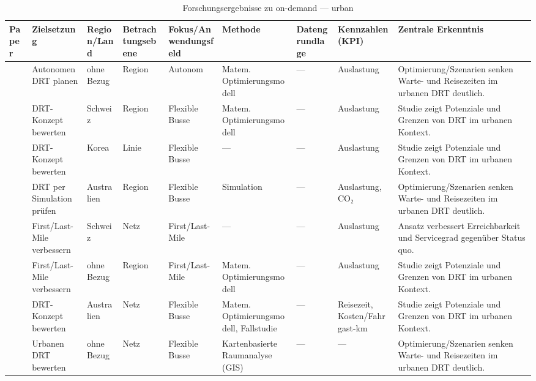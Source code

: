 \begin{table}[p]
\centering
\caption{Forschungsergebnisse zu on-demand — urban}
\label{tab:ondemand-urban-2}
\scriptsize
\setlength{\tabcolsep}{2.5pt}
\begin{tabularx}{\textwidth}{
  >{\RaggedRight\arraybackslash}p{2.8cm}
  >{\RaggedRight\arraybackslash}p{2.2cm}
  >{\RaggedRight\arraybackslash}p{1.8cm}
  >{\RaggedRight\arraybackslash}p{1.8cm}
  >{\RaggedRight\arraybackslash}p{2.0cm}
  >{\RaggedRight\arraybackslash}p{2.6cm}
  >{\RaggedRight\arraybackslash}p{1.8cm}
  >{\RaggedRight\arraybackslash}p{2.2cm}
  >{\RaggedRight\arraybackslash}X
}
\toprule
Paper & Zielsetzung & Region/Land & Betrachtungsebene & Fokus/Anwendungsfeld & Methode & Datengrundlage & Kennzahlen (KPI) & Zentrale Erkenntnis \\
\midrule
\textcite{ja\_ger\_2018\_multiagentsimulati} & Autonomen DRT planen & ohne Bezug & Region & Autonom & Matem. Optimierungsmodell & — & Auslastung & Optimierung/Szenarien senken Warte- und Reisezeiten im urbanen DRT deutlich. \\ \hline
\textcite{kim\_2025\_optimizationandimp} & DRT-Konzept bewerten & Schweiz & Region & Flexible Busse & Matem. Optimierungsmodell & — & Auslastung & Studie zeigt Potenziale und Grenzen von DRT im urbanen Kontext. \\ \hline
\textcite{li\_2024\_efficientrouteplan} & DRT-Konzept bewerten & Korea & Linie & Flexible Busse & — & — & Auslastung & Studie zeigt Potenziale und Grenzen von DRT im urbanen Kontext. \\ \hline
\textcite{liyanage\_2020\_anagentbasedsimula} & DRT per Simulation prüfen & Australien & Region & Flexible Busse & Simulation & — & Auslastung, CO₂ & Optimierung/Szenarien senken Warte- und Reisezeiten im urbanen DRT deutlich. \\ \hline
\textcite{melo\_2024\_demandresponsivetr} & First/Last-Mile verbessern & Schweiz & Netz & First/Last-Mile & — & — & Auslastung & Ansatz verbessert Erreichbarkeit und Servicegrad gegenüber Status quo. \\ \hline
\textcite{meshkani\_2024\_innovativeondemand} & First/Last-Mile verbessern & ohne Bezug & Region & First/Last-Mile & Matem. Optimierungsmodell & — & Auslastung & Studie zeigt Potenziale und Grenzen von DRT im urbanen Kontext. \\ \hline
\textcite{mortazavi\_2024\_integrateddemandre} & DRT-Konzept bewerten & Australien & Netz & Flexible Busse & Matem. Optimierungsmodell, Fallstudie & — & Reisezeit, Kosten/Fahrgast-km & Studie zeigt Potenziale und Grenzen von DRT im urbanen Kontext. \\ \hline
\textcite{pal\_2016\_smartporteracombin} & Urbanen DRT bewerten & ohne Bezug & Netz & Flexible Busse & Kartenbasierte Raumanalyse (GIS) & — & — & Optimierung/Szenarien senken Warte- und Reisezeiten im urbanen DRT deutlich. \\ \hline
\bottomrule
\end{tabularx}
\end{table}
